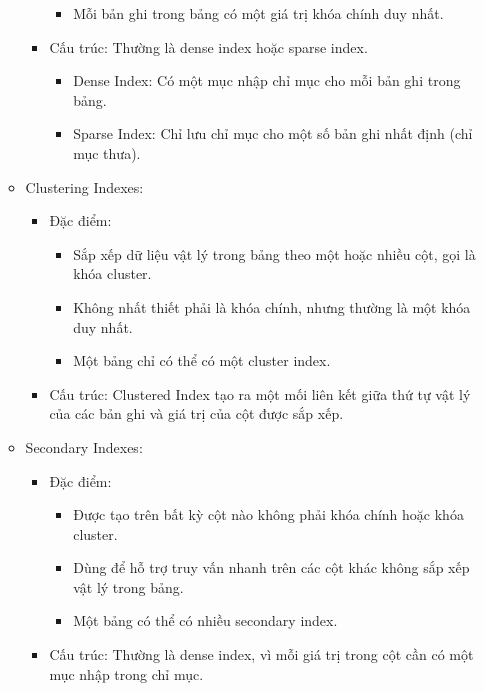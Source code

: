 \begin{itemize}
\begin{itemize}
\begin{itemize}
\begin{itemize}
                            \item Mỗi bản ghi trong bảng có một giá trị khóa chính duy nhất.
                        \end{itemize}
                    \item Cấu trúc: Thường là dense index hoặc sparse index.
                        \begin{itemize}
                            \item Dense Index: Có một mục nhập chỉ mục cho mỗi bản ghi trong bảng.
                            \item Sparse Index: Chỉ lưu chỉ mục cho một số bản ghi nhất định (chỉ mục thưa).
                        \end{itemize}
                \end{itemize}
            \item Clustering Indexes:
                \begin{itemize}
                    \item Đặc điểm:
                        \begin{itemize}
                            \item Sắp xếp dữ liệu vật lý trong bảng theo một hoặc nhiều cột, gọi là khóa cluster.
                            \item Không nhất thiết phải là khóa chính, nhưng thường là một khóa duy nhất.
                            \item Một bảng chỉ có thể có một cluster index.
                        \end{itemize}
                    \item Cấu trúc: Clustered Index tạo ra một mối liên kết giữa thứ tự vật lý của các bản ghi và giá trị của cột được sắp xếp.
                \end{itemize}
            \item Secondary Indexes:
                \begin{itemize}
                    \item Đặc điểm:
                        \begin{itemize}
                            \item Được tạo trên bất kỳ cột nào không phải khóa chính hoặc khóa cluster.
                            \item Dùng để hỗ trợ truy vấn nhanh trên các cột khác không sắp xếp vật lý trong bảng.
                            \item Một bảng có thể có nhiều secondary index.
                        \end{itemize}
                    \item Cấu trúc: Thường là dense index, vì mỗi giá trị trong cột cần có một mục nhập trong chỉ mục.
                \end{itemize}
        \end{itemize}
\end{itemize}

